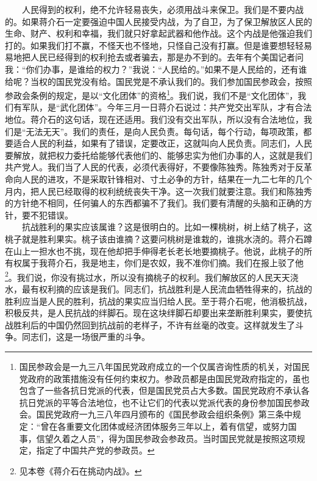 \documentclass[cn,11pt,chinese]{elegantbook}
\begin{document}
　　人民得到的权利，绝不允许轻易丧失，必须用战斗来保卫。我们是不要内战的。如果蒋介石一定要强迫中国人民接受内战，为了自卫，为了保卫解放区人民的生命、财产、权利和幸福，我们就只好拿起武器和他作战。这个内战是他强迫我们打的。如果我们打不赢，不怪天也不怪地，只怪自己没有打赢。但是谁要想轻轻易易地把人民已经得到的权利抢去或者骗去，那是办不到的。去年有个美国记者问我：“你们办事，是谁给的权力？”我说：“人民给的。”如果不是人民给的，还有谁给呢？当权的国民党没有给。国民党是不承认我们的。我们参加国民参政会，按照参政会条例的规定，是以“文化团体”的资格\footnote[8]{ 国民参政会是一九三八年国民党政府成立的一个仅属咨询性质的机关，对国民党政府的政策措施没有任何约束权力。参政员都是由国民党政府指定的，虽也包含了一些各抗日党派的代表，但是国民党员占大多数。国民党政府不承认各抗日党派的平等合法地位，也不让它们的代表以党派代表的身份参加国民参政会。国民党政府一九三八年四月颁布的《国民参政会组织条例》第三条中规定：“曾在各重要文化团体或经济团体服务三年以上，着有信望，或努力国事，信望久着之人员”，得为国民参政会参政员。当时国民党就是按照这项规定，指定了中国共产党的参政员。}。我们说，我们不是“文化团体”，我们有军队，是“武化团体”。今年三月一日蒋介石说过：共产党交出军队，才有合法地位。蒋介石的这句话，现在还适用。我们没有交出军队，所以没有合法地位，我们是“无法无天”。我们的责任，是向人民负责。每句话，每个行动，每项政策，都要适合人民的利益，如果有了错误，定要改正，这就叫向人民负责。同志们，人民要解放，就把权力委托给能够代表他们的、能够忠实为他们办事的人，这就是我们共产党人。我们当了人民的代表，必须代表得好，不要像陈独秀。陈独秀对于反革命向人民的进攻，不是采取针锋相对、寸土必争的方针，结果在一九二七年的几个月内，把人民已经取得的权利统统丧失干净。这一次我们就要注意。我们和陈独秀的方针绝不相同，任何骗人的东西都骗不了我们。我们要有清醒的头脑和正确的方针，要不犯错误。\\
　　抗战胜利的果实应该属谁？这是很明白的。比如一棵桃树，树上结了桃子，这桃子就是胜利果实。桃子该由谁摘？这要问桃树是谁栽的，谁挑水浇的。蒋介石蹲在山上一担水也不挑，现在他却把手伸得老长老长地要摘桃子。他说，此桃子的所有权属于我蒋介石，我是地主，你们是农奴，我不准你们摘。我们在报上驳了他\footnote[9]{ 见本卷《蒋介石在挑动内战》。}。我们说，你没有挑过水，所以没有摘桃子的权利。我们解放区的人民天天浇水，最有权利摘的应该是我们。同志们，抗战胜利是人民流血牺牲得来的，抗战的胜利应当是人民的胜利，抗战的果实应当归给人民。至于蒋介石呢，他消极抗战，积极反共，是人民抗战的绊脚石。现在这块绊脚石却要出来垄断胜利果实，要使抗战胜利后的中国仍然回到抗战前的老样子，不许有丝毫的改变。这样就发生了斗争。同志们，这是一场很严重的斗争。\\
\end{document}
